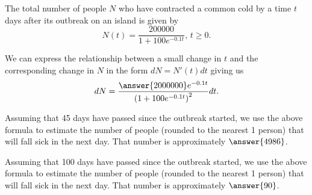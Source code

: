 \documentclass{ximera}
\author{Nela Lakos \and Kyle Parsons}
\begin{document}
\begin{exercise}

The total number of people $N$ who have contracted a common cold by a time $t$ days after its outbreak on an island is given by
\[
N(t) = \frac{200000}{1+100e^{-0.1t}},\,t\geq0.
\]

We can express the relationship between a small change in $t$ and the corresponding change in $N$ in the form $dN = N'(t)dt$ giving us
\[
dN = \frac{\answer{2000000}e^{-0.1t}}{\left(1+100e^{-0.1t}\right)^2}dt.
\]

Assuming that 45 days have passed since the outbreak started, we use the above formula to estimate the number of people (rounded to the nearest 1 person) that will fall sick in the next day. That number is approximately $\answer{4986}$.

Assuming that 100 days have passed since the outbreak started, we use the above formula to estimate the number of people (rounded to the nearest 1 person) that will fall sick in the next day. That number is approximately $\answer{90}$.

\end{exercise}
\end{document}
